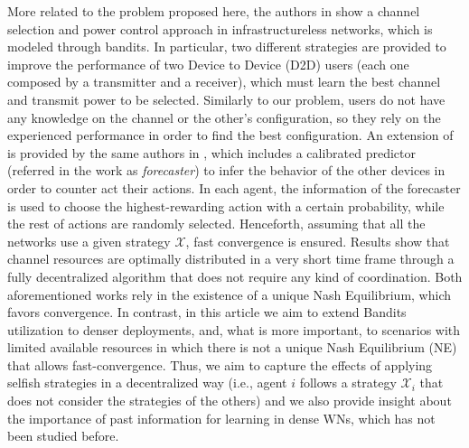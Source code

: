\documentclass[preprint,12pt]{elsarticle}
\begin{document}
More related to the problem proposed here, the authors in \cite{maghsudi2015joint} show a channel selection and power control approach in infrastructureless networks, which is modeled through bandits. In particular, two different strategies are provided to improve the performance of two Device to Device (D2D) users (each one composed by a transmitter and a receiver), which must learn the best channel and transmit power to be selected. Similarly to our problem, users do not have any knowledge on the channel or the other's configuration, so they rely on the experienced performance in order to find the best configuration. An extension of \cite{maghsudi2015joint} is provided by the same authors in \cite{maghsudi2015channel}, which includes a calibrated predictor (referred in the work as \textit{forecaster}) to infer the behavior of the other devices in order to counter act their actions. In each agent, the information of the forecaster is used to choose the highest-rewarding action with a certain probability, while the rest of actions are randomly selected. Henceforth, assuming that all the networks use a given strategy $\mathcal{X}$, fast convergence is ensured. Results show that channel resources are optimally distributed in a very short time frame through a fully decentralized algorithm that does not require any kind of coordination. Both aforementioned works rely in the existence of a unique Nash Equilibrium, which favors convergence. In contrast, in this article we aim to extend Bandits utilization to denser deployments, and, what is more important, to scenarios with limited available resources in which there is not a unique Nash Equilibrium (NE) that allows fast-convergence. Thus, we aim to capture the effects of applying selfish strategies in a decentralized way (i.e., agent $i$ follows a strategy $\mathcal{X}_i$ that does not consider the strategies of the others) and we also provide insight about the importance of past information for learning in dense WNs, which has not been studied before.

\end{document}
